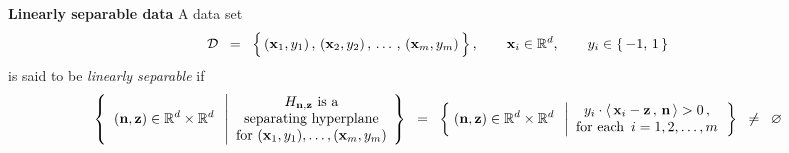 
\vskip 0.3cm
\noindent
\textbf{Linearly separable data}
\vskip 0.1cm
\noindent
A data set
\begin{equation*}
\mathcal{D}
\;\; = \;\;
	\left\{\,
		(\overset{{\color{white}-}}{\mathbf{x}}_{1},y_{1})\,,\,(\mathbf{x}_{2},y_{2})\,,\,\ldots\,,\,(\mathbf{x}_{m},y_{m})
		\,\right\},
\quad\quad
\mathbf{x}_{i} \in \Re^{d},
\quad\quad
y_{i} \in \{\,-1,\,1\,\}
\end{equation*}
is said to be \textit{linearly separable} if
\begin{equation*}
	\left\{\;\;
		(\mathbf{n},\mathbf{z}) \in \mathbb{R}^{d} \times \mathbb{R}^{d}
		\;\;\left\vert
		\begin{array}{c}
			\textnormal{$H_{\mathbf{n},\mathbf{z}}$ is a}
			\\
			\textnormal{separating hyperplane}
			\\
			\textnormal{for $(\mathbf{x}_{1},y_{1}),\ldots,(\mathbf{x}_{m},y_{m})$}
			\end{array}
			\right.
		\!\right\}
\;\; = \;\;
	\left\{\;
		(\mathbf{n},\mathbf{z}) \in \mathbb{R}^{d} \times \mathbb{R}^{d}
		\;\;\left\vert
		\begin{array}{c}
			y_{i}\cdot\langle\,\mathbf{x}_{i} - \mathbf{z}\,,\,\mathbf{n}\,\rangle > 0\,,
			\\
			\textnormal{for each \,$i = 1,2,\ldots,m$}
			\end{array}
			\right.
		\right\}
\;\; \neq \;\;
	\varnothing
\end{equation*}


